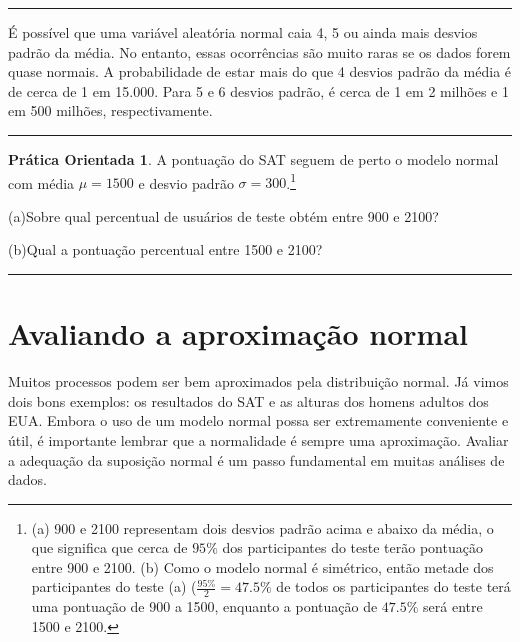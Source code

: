 \documentclass[
]{book}
\theoremstyle{definition}
\theoremstyle{definition}
\theoremstyle{definition}
\newtheorem{exercise}{Prática Orientada}[chapter]
\theoremstyle{definition}
\theoremstyle{remark}
\begin{document}
\begin{center}\rule{0.5\linewidth}{0.5pt}\end{center}

É possível que uma variável aleatória normal caia 4, 5 ou ainda mais desvios padrão da média. No entanto, essas ocorrências são muito raras se os dados forem quase normais. A probabilidade de estar mais do que 4 desvios padrão da média é de cerca de 1 em 15.000. Para 5 e 6 desvios padrão, é cerca de 1 em 2 milhões e 1 em 500 milhões, respectivamente.

\begin{center}\rule{0.5\linewidth}{0.5pt}\end{center}

\begin{exercise}
\protect\hypertarget{exr:unnamed-chunk-117}{}{\label{exr:unnamed-chunk-117} }A pontuação do SAT seguem de perto o modelo normal com média \(\mu = 1500\) e desvio padrão \(\sigma = 300\).\footnote{(a) 900 e 2100 representam dois desvios padrão acima e abaixo da média, o que significa que cerca de \(95\%\) dos participantes do teste terão pontuação entre 900 e 2100. (b) Como o modelo normal é simétrico, então metade dos participantes do teste (a) (\(\frac{95\%}{2} = 47.5\%\) de todos os participantes do teste terá uma pontuação de 900 a 1500, enquanto a pontuação de \(47.5\%\) será entre 1500 e 2100.}

(a)Sobre qual percentual de usuários de teste obtém entre 900 e 2100?

(b)Qual a pontuação percentual entre 1500 e 2100?
\end{exercise}

\begin{center}\rule{0.5\linewidth}{0.5pt}\end{center}

\hypertarget{assessingNormalApproach}{%
\section{Avaliando a aproximação normal}\label{assessingNormalApproach}}

Muitos processos podem ser bem aproximados pela distribuição normal. Já vimos dois bons exemplos: os resultados do SAT e as alturas dos homens adultos dos EUA. Embora o uso de um modelo normal possa ser extremamente conveniente e útil, é importante lembrar que a normalidade é sempre uma aproximação. Avaliar a adequação da suposição normal é um passo fundamental em muitas análises de dados.
\end{document}
